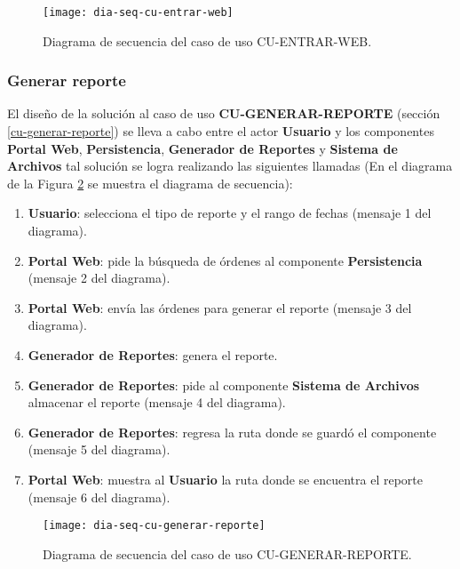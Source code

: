 \begin{figure}[h]
	\centering
	\texttt{[image: dia-seq-cu-entrar-web]}
	\caption{Diagrama de secuencia del caso de uso CU-ENTRAR-WEB.}
	\label{fig:dia-seq-cu-entrar-web}
\end{figure}

\subsubsection{Generar reporte}
El diseño de la solución al caso de uso \textbf{CU-GENERAR-REPORTE} (sección \ref{cu-generar-reporte}) se lleva a cabo entre el actor \textbf{Usuario} y los componentes \textbf{Portal Web}, \textbf{Persistencia}, \textbf{Generador de Reportes} y  \textbf{Sistema de Archivos} tal solución se logra realizando las siguientes llamadas (En el diagrama de la Figura \ref{fig:dia-seq-cu-generar-reporte} se muestra el diagrama de secuencia):
\begin{enumerate}
	\item \textbf{Usuario}: selecciona el tipo de reporte y el rango de fechas (mensaje 1 del diagrama).
	\item \textbf{Portal Web}: pide la búsqueda de órdenes al componente \textbf{Persistencia} (mensaje 2 del diagrama).
	\item \textbf{Portal Web}: envía las órdenes para generar el reporte (mensaje 3 del diagrama).
	\item \textbf{Generador de Reportes}: genera el reporte.
	\item \textbf{Generador de Reportes}: pide al componente \textbf{Sistema de Archivos} almacenar el reporte (mensaje 4 del diagrama).
	\item \textbf{Generador de Reportes}: regresa la ruta donde se guardó el componente (mensaje 5 del diagrama).
	\item \textbf{Portal Web}: muestra al \textbf{Usuario} la ruta donde se encuentra el reporte (mensaje 6 del diagrama).
\end{enumerate}

\begin{figure}[h]
	\centering
	\texttt{[image: dia-seq-cu-generar-reporte]}
	\caption{Diagrama de secuencia del caso de uso CU-GENERAR-REPORTE.}
	\label{fig:dia-seq-cu-generar-reporte}
\end{figure}

